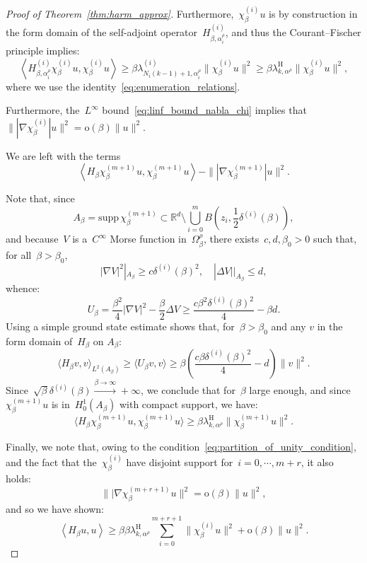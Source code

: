\documentclass[10pt]{article}
\newcommand{\R}{\mathbb{R}}
\newcommand{\1}{\mathbbm 1}
\newcommand{\supp}{\mathrm{supp}}
\newcommand{\shift}{\rho} %
\newcommand{\deltai}{\delta^{(i)}}
\begin{document}
\begin{proof}[Proof of Theorem~\ref{thm:harm_approx}]
        Furthermore,~$\chi_\beta^{(i)}u$ is by construction in the form domain of the self-adjoint operator~$H_{\beta,\alpha^\shift_{i}}^{(i)}$, and thus the Courant--Fischer principle implies:
        \begin{equation}
            \left\langle H_{\beta,\alpha^\shift_{i}}^{(i)}\chi_\beta^{(i)}u,\chi_\beta^{(i)}u\right\rangle \geq \beta\lambda_{N_i(k-1)+1,\alpha^\shift_{i}}^{(i)}\|\chi_\beta^{(i)}u\|^2\geq \beta \lambda_{k,\alpha^\shift}^{\mathrm H}\|\chi_\beta^{(i)}u\|^2,
        \end{equation}
        where we use the identity~\eqref{eq:enumeration_relations}.

        Furthermore, the~$L^\infty$ bound~\eqref{eq:linf_bound_nabla_chi} implies that~$\||\nabla\chi_\beta^{(i)}|u\|^2 = \mathrm{o}(\beta)\|u\|^2$.

        We are left with the terms
        \[\left\langle H_\beta \chi_\beta^{(m+1)}u,\chi_\beta^{(m+1)}u\right\rangle - \||\nabla \chi_\beta^{(m+1)}|u\|^2.\]

        Note that, since
       ~$$ A_\beta = \supp\,\chi_\beta^{(m+1)} \subset \R^d\setminus \bigcup_{i=0}^m B\left(z_i,\frac12\deltai(\beta)\right),$$
        and because~$V$ is a~$C^\infty$ Morse function in~$ \Omega_\beta^\shift$, there exists~$c,d,\beta_0>0$ such that, for all~$\beta>\beta_0$,
        \[|\nabla V|^2 |_{A_\beta} \geq c\deltai(\beta)^2,\quad |\Delta V| |_{A_\beta} \leq d,\]
        whence:
        \[U_\beta=\frac{\beta^2}4|\nabla V|^2 -\frac\beta 2 \Delta V \geq  \frac{c\beta^2 \deltai(\beta)^2}{4}-\beta d.\]
        Using a simple ground state estimate shows that, for~$\beta>\beta_0$ and any $v$ in the form domain of~$H_\beta$ on $A_\beta$:
        \[\langle H_\beta v,v\rangle_{L^2(A_\beta)} \geq \langle U_\beta v,v\rangle \geq \beta\left(\frac{c\beta\deltai(\beta)^2}{4}-d\right)\|v\|^2.\]
        Since~$\sqrt\beta\deltai(\beta)\overset{\beta\to\infty}{\longrightarrow} +\infty$, we conclude that for~$\beta$ large enough, and since~$\chi_\beta^{(m+1)}u$ is in~$H_0^1(A_\beta)$ with compact support, we have:
        \[\langle H_\beta \chi_\beta^{(m+1)}u,\chi_\beta^{(m+1)}u\rangle \geq \beta\lambda_{k,\alpha^\shift}^{\mathrm{H}}\|\chi_\beta^{(m+1)}u\|^2.\]

        Finally, we note that, owing to the condition~\eqref{eq:partition_of_unity_condition}, and the fact that the~$\chi_\beta^{(i)}$ have disjoint support for~$i=0,\dotsm,m+r$, it also holds:
       ~$$\||\nabla \chi_\beta^{(m+r+1)}u\|^2 = \mathrm{o}(\beta)\|u\|^2,$$
        and so we have shown:
        \begin{equation}
            \left\langle H_\beta u,u \right\rangle \geq \beta  \beta\lambda_{k,\alpha^\shift}^{\mathrm H} \sum_{i=0}^{m+r+1}\|\chi_\beta^{(i)}u\|^2 + \mathrm o(\beta)\|u\|^2.
        \end{equation}


\end{proof}
\end{document}
